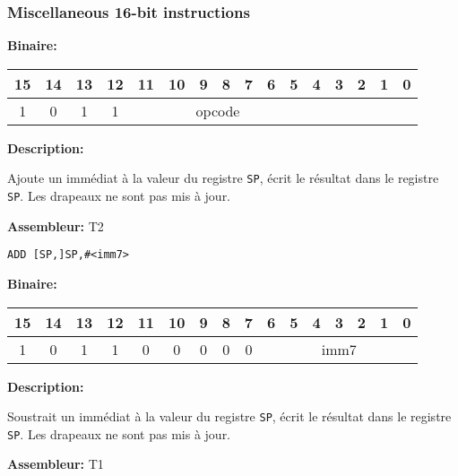 \documentclass{article}
\begin{document}
    \subsubsection{Miscellaneous 16-bit instructions}
    \label{subsubsec:MiscInstr}

    \textbf{Binaire:}

    \begin{tabular}{| c c c c c c c c c c c c c c c c |}
        \hline
        15 & 14 & 13 & 12 & \multicolumn{1}{|c}{11} & 10 & 9 & 8 & 7 & 6 & 5 & \multicolumn{1}{|c}{4} & 3 & 2 & 1 & 0 \\
        \hline
        1 & 0 & 1 & 1 & \multicolumn{7}{|c}{opcode} & \multicolumn{5}{|c|}{} \\
        \hline
    \end{tabular}


    \textbf{Description: }

    Ajoute un immédiat à la valeur du registre \texttt{SP}, écrit le résultat dans le registre \texttt{SP}.
    Les drapeaux ne sont pas mis à jour.

    \textbf{Assembleur:} T2

    \begin{lstlisting}
ADD [SP,]SP,#<imm7>
    \end{lstlisting}

    \textbf{Binaire:}

    \begin{tabular}{| c c c c c c c c c c c c c c c c |}
        \hline
        15 & 14 & 13 & 12 & \multicolumn{1}{|c}{11} & 10 & 9 & 8 & \multicolumn{1}{|c}{7} & \multicolumn{1}{|c}{6} & 5 & 4 & 3 & 2 & 1 & 0 \\
        \hline
        1 & 0 & 1 & 1 & \multicolumn{1}{|c}{0} & 0 & 0 & 0 & \multicolumn{1}{|c}{0} & \multicolumn{7}{|c|}{imm7} \\
        \hline
    \end{tabular}


    \textbf{Description: }

    Soustrait un immédiat à la valeur du registre \texttt{SP}, écrit le résultat dans le registre \texttt{SP}.
    Les drapeaux ne sont pas mis à jour.

    \textbf{Assembleur:} T1
\end{document}
